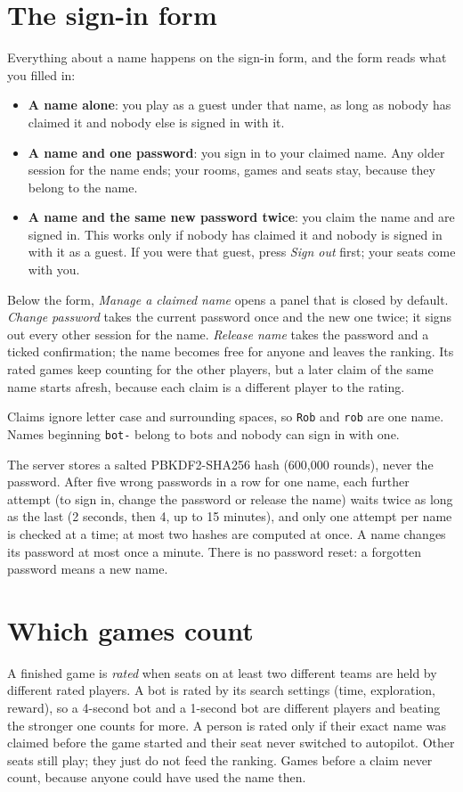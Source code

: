 \documentclass[11pt,oneside]{book}
\begin{document}
\section{The sign-in form}
Everything about a name happens on the sign-in form, and the form reads what you
filled in:
\begin{itemize}
  \item \textbf{A name alone}: you play as a guest under that name, as long as
  nobody has claimed it and nobody else is signed in with it.
  \item \textbf{A name and one password}: you sign in to your claimed name. Any
  older session for the name ends; your rooms, games and seats stay, because they
  belong to the name.
  \item \textbf{A name and the same new password twice}: you claim the name and
  are signed in. This works only if nobody has claimed it and nobody is signed in
  with it as a guest. If you were that guest, press \emph{Sign out} first; your
  seats come with you.
\end{itemize}
Below the form, \emph{Manage a claimed name} opens a panel that is closed by
default. \emph{Change password} takes the current password once and the new one
twice; it signs out every other session for the name. \emph{Release name} takes
the password and a ticked confirmation; the name becomes free for anyone and
leaves the ranking. Its rated games keep counting for the other players, but a
later claim of the same name starts afresh, because each claim is a different
player to the rating.

Claims ignore letter case and surrounding spaces, so \texttt{Rob} and
\texttt{rob} are one name. Names beginning \texttt{bot-} belong to bots and
nobody can sign in with one.

The server stores a salted PBKDF2-SHA256 hash (600{,}000 rounds), never the
password. After five wrong passwords in a row for one name, each further
attempt (to sign in, change the password or release the name) waits twice as
long as the last (2 seconds, then 4, up to 15 minutes), and only one attempt per
name is checked at a time; at most two hashes are computed at once. A name
changes its password at most once a minute. There is no password reset: a
forgotten password means a new name.

\section{Which games count}
A finished game is \emph{rated} when seats on at least two different teams are
held by different rated players. A bot is rated by its search settings (time,
exploration, reward), so a 4-second bot and a 1-second bot are different
players and beating the stronger one counts for more. A person is rated only if
their exact name was claimed before the game started and their seat never
switched to autopilot. Other seats still play; they just do not feed the
ranking. Games before a claim never count, because anyone could have used the
name then.
\end{document}
